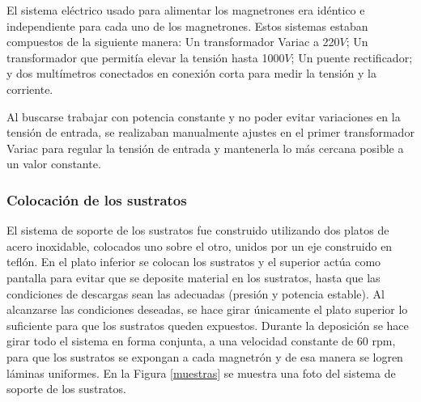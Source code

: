 \documentclass[12pt]{article}
\theoremstyle{definition}
\theoremstyle{remark}
\begin{document}
El sistema eléctrico usado para alimentar los magnetrones era idéntico e independiente para cada uno de los magnetrones. Estos sistemas estaban compuestos de la siguiente manera: Un transformador Variac a 220$V$; Un transformador que permitía elevar la tensión hasta 1000$V$; Un puente rectificador; y dos multímetros conectados en conexión corta para medir la tensión y la corriente.

Al buscarse trabajar con potencia constante y no poder evitar variaciones en la tensión de entrada, se realizaban manualmente ajustes en el primer transformador Variac para regular la tensión de entrada y mantenerla lo más cercana posible a un valor constante.

\subsubsection{Colocación de los sustratos}

El sistema de soporte de los sustratos fue construido utilizando dos platos de acero inoxidable, colocados uno sobre el otro, unidos por un eje construido en teflón. En el plato inferior se colocan los sustratos y el superior actúa como pantalla para evitar que se deposite material en los sustratos, hasta que las condiciones de descargas sean las adecuadas (presión y potencia estable). Al alcanzarse las condiciones deseadas, se hace girar únicamente el plato superior lo suficiente para que los sustratos queden expuestos. Durante la deposición se hace girar todo el sistema en forma conjunta, a una velocidad constante de 60 rpm, para que los sustratos se expongan a cada magnetrón y de esa manera se logren láminas uniformes. En la Figura \ref{muestras} se muestra una foto del sistema de soporte de los sustratos.
\end{document}
